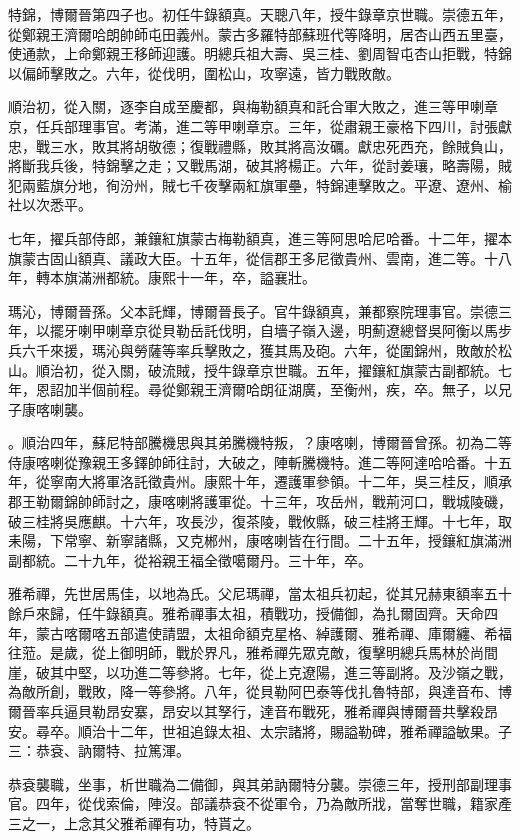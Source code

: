 \begin{pinyinscope}
特錦，博爾晉第四子也。初任牛錄額真。天聰八年，授牛錄章京世職。崇德五年，從鄭親王濟爾哈朗帥師屯田義州。蒙古多羅特部蘇班代等降明，居杏山西五里臺，使通款，上命鄭親王移師迎護。明總兵祖大壽、吳三桂、劉周智屯杏山拒戰，特錦以偏師擊敗之。六年，從伐明，圍松山，攻寧遠，皆力戰敗敵。

順治初，從入關，逐李自成至慶都，與梅勒額真和託合軍大敗之，進三等甲喇章京，任兵部理事官。考滿，進二等甲喇章京。三年，從肅親王豪格下四川，討張獻忠，戰三水，敗其將胡敬德；復戰禮縣，敗其將高汝礪。獻忠死西充，餘賊負山，將斷我兵後，特錦擊之走；又戰馬湖，破其將楊正。六年，從討姜瓖，略壽陽，賊犯兩藍旗分地，徇汾州，賊七千夜擊兩紅旗軍壘，特錦連擊敗之。平遼、遼州、榆社以次悉平。

七年，擢兵部侍郎，兼鑲紅旗蒙古梅勒額真，進三等阿思哈尼哈番。十二年，擢本旗蒙古固山額真、議政大臣。十五年，從信郡王多尼徵貴州、雲南，進二等。十八年，轉本旗滿洲都統。康熙十一年，卒，謚襄壯。

瑪沁，博爾晉孫。父本託輝，博爾晉長子。官牛錄額真，兼都察院理事官。崇德三年，以擺牙喇甲喇章京從貝勒岳託伐明，自墻子嶺入邊，明薊遼總督吳阿衡以馬步兵六千來援，瑪沁與勞薩等率兵擊敗之，獲其馬及砲。六年，從圍錦州，敗敵於松山。順治初，從入關，破流賊，授牛錄章京世職。五年，擢鑲紅旗蒙古副都統。七年，恩詔加半個前程。尋從鄭親王濟爾哈朗征湖廣，至衡州，疾，卒。無子，以兄子康喀喇襲。

。順治四年，蘇尼特部騰機思與其弟騰機特叛，？康喀喇，博爾晉曾孫。初為二等侍康喀喇從豫親王多鐸帥師往討，大破之，陣斬騰機特。進二等阿達哈哈番。十五年，從寧南大將軍洛託徵貴州。康熙十年，遷護軍參領。十二年，吳三桂反，順承郡王勒爾錦帥師討之，康喀喇將護軍從。十三年，攻岳州，戰荊河口，戰城陵磯，破三桂將吳應麒。十六年，攻長沙，復茶陵，戰攸縣，破三桂將王輝。十七年，取耒陽，下常寧、新寧諸縣，又克郴州，康喀喇皆在行間。二十五年，授鑲紅旗滿洲副都統。二十九年，從裕親王福全徵噶爾丹。三十年，卒。

雅希禪，先世居馬佳，以地為氏。父尼瑪禪，當太祖兵初起，從其兄赫東額率五十餘戶來歸，任牛錄額真。雅希禪事太祖，積戰功，授備御，為扎爾固齊。天命四年，蒙古喀爾喀五部遣使請盟，太祖命額克星格、綽護爾、雅希禪、庫爾纏、希福往蒞。是歲，從上御明師，戰於界凡，雅希禪先眾克敵，復擊明總兵馬林於尚間崖，破其中堅，以功進二等參將。七年，從上克遼陽，進三等副將。及沙嶺之戰，為敵所創，戰敗，降一等參將。八年，從貝勒阿巴泰等伐扎魯特部，與達音布、博爾晉率兵逼貝勒昂安寨，昂安以其孥行，達音布戰死，雅希禪與博爾晉共擊殺昂安。尋卒。順治十二年，世祖追錄太祖、太宗諸將，賜謚勒碑，雅希禪謚敏果。子三：恭袞、訥爾特、拉篤渾。

恭袞襲職，坐事，析世職為二備御，與其弟訥爾特分襲。崇德三年，授刑部副理事官。四年，從伐索倫，陣沒。部議恭袞不從軍令，乃為敵所戕，當奪世職，籍家產三之一，上念其父雅希禪有功，特貰之。


\end{pinyinscope}
